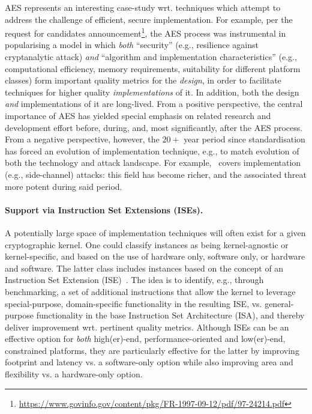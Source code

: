 AES represents an interesting case-study wrt. techniques which attempt to 
address the challenge of efficient, secure implementation.  For example,
per the request for candidates announcement\footnote{%
\url{https://www.govinfo.gov/content/pkg/FR-1997-09-12/pdf/97-24214.pdf}
}, the AES process was instrumental in popularising a model in which
{\em both}
``security''
(e.g., resilience against cryptanalytic attack)
{\em and}
``algorithm and implementation characteristics''
(e.g., computational efficiency, memory requirements, suitability for different platform classes)
form important quality metrics for the {\em design}, in order to facilitate
techniques for higher quality {\em implementations} of it.
In addition,
both the design {\em and} implementations of it are long-lived.
From a positive perspective, 
the central importance of AES has yielded special emphasis on related
research and development effort before, during, and, most significantly, 
after the AES process.
From a negative perspective, however,
the $20+$ year period since standardisation has forced an evolution of 
implementation technique, e.g., to match evolution of both the technology 
and attack landscape.  For example,~\cite[Section 3.6]{NBBBDFR:01} covers
implementation (e.g., side-channel) attacks: this field has become richer,
and the associated threat more potent during said period.


\paragraph{Support via Instruction Set Extensions (ISEs).}

A potentially large space of implementation techniques will often exist
for a given cryptographic kernel.  One could classify instances as being 
   kernel-agnostic
   or
   kernel-specific,
and based on the use of   
   hardware              only,
                software only,
   or
   hardware and software.
The latter class includes instances based on the concept of an
Instruction Set Extension (ISE)~\cite{GalBer:11,BarGioMar:09,RegIen:16}.
The idea is to identify, e.g., through benchmarking, a set of additional 
instructions that allow the kernel to leverage
special-purpose, domain-specific functionality
in the resulting ISE,
vs. 
general-purpose                  functionality
in the base Instruction Set Architecture (ISA),
and thereby deliver improvement wrt. pertinent quality metrics.  
Although ISEs can be an effective option for {\em both}
high(er)-end, performance-oriented
and
 low(er)-end, constrained
platforms, 
they are particularly effective for the latter by 
improving footprint and latency
vs. a software-only option
while also
improving area      and flexibility
vs. a hardware-only option.

